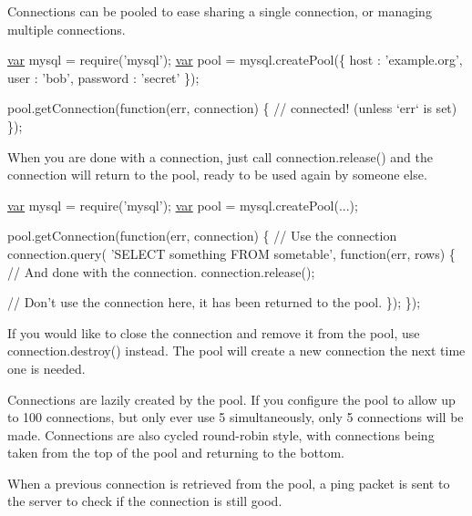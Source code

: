 Connections can be pooled to ease sharing a single connection, or managing multiple connections.


\begin{DoxyCode}
\hyperlink{018__def_8c_a335628f2e9085305224b4f9cc6e95ed5}{var} mysql = require(\textcolor{stringliteral}{'mysql'});
\hyperlink{018__def_8c_a335628f2e9085305224b4f9cc6e95ed5}{var} pool  = mysql.createPool(\{
  host     : \textcolor{stringliteral}{'example.org'},
  user     : \textcolor{stringliteral}{'bob'},
  password : \textcolor{stringliteral}{'secret'}
\});

pool.getConnection(\textcolor{keyword}{function}(err, connection) \{
  \textcolor{comment}{// connected! (unless `err` is set)}
\});
\end{DoxyCode}


When you are done with a connection, just call {\ttfamily connection.\+release()} and the connection will return to the pool, ready to be used again by someone else.


\begin{DoxyCode}
\hyperlink{018__def_8c_a335628f2e9085305224b4f9cc6e95ed5}{var} mysql = require(\textcolor{stringliteral}{'mysql'});
\hyperlink{018__def_8c_a335628f2e9085305224b4f9cc6e95ed5}{var} pool  = mysql.createPool(...);

pool.getConnection(\textcolor{keyword}{function}(err, connection) \{
  \textcolor{comment}{// Use the connection}
  connection.query( \textcolor{stringliteral}{'SELECT something FROM sometable'}, \textcolor{keyword}{function}(err, rows) \{
    \textcolor{comment}{// And done with the connection.}
    connection.release();

    \textcolor{comment}{// Don't use the connection here, it has been returned to the pool.}
  \});
\});
\end{DoxyCode}


If you would like to close the connection and remove it from the pool, use {\ttfamily connection.\+destroy()} instead. The pool will create a new connection the next time one is needed.

Connections are lazily created by the pool. If you configure the pool to allow up to 100 connections, but only ever use 5 simultaneously, only 5 connections will be made. Connections are also cycled round-\/robin style, with connections being taken from the top of the pool and returning to the bottom.

When a previous connection is retrieved from the pool, a ping packet is sent to the server to check if the connection is still good.


